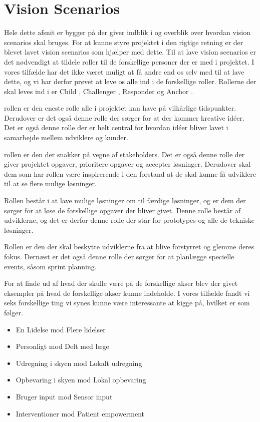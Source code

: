 \section{Vision Scenarios}
Hele dette afsnit er bygger på \citet[Sektion 17.1]{art:essence} der giver indblik i og overblik over hvordan vision scenarios skal bruges.
For at kunne styre projektet i den rigtige retning er der blevet lavet vision scenarios som hjælper med dette.
Til at lave vision scenarios er det nødvendigt at tildele roller til de forskellige personer der er med i projektet.
I vores tilfælde har det ikke været muligt at få andre end os selv med til at lave dette, og vi har derfor prøvet at leve os alle ind i de forskellige roller.
Rollerne der skal leves ind i er Child \citep[Sektion 18]{art:essence}, Challenger \citep[Sektion 19]{art:essence}, Responder \citep[Sektion 20]{art:essence} og Anchor \citep[Sektion 21]{art:essence}.

\begin{description}[style=nextline]
	\item[Child] 
		rollen er den eneste rolle alle i projektet kan have på vilkårlige tidspunkter.
		Derudover er det også denne rolle der sørger for at der kommer kreative idéer.
		Det er også denne rolle der er helt central for hvordan idéer bliver lavet i samarbejde mellem udviklere og kunder. 
	\item[Challenger]
		rollen er den der snakker på vegne af stakeholders.
		Det er også denne rolle der giver projektet opgaver, prioritere opgaver og accepter løsninger.
		Derudover skal dem som har rollen være inspirerende i den forstand at de skal kunne få udviklere til at se flere mulige løsninger. 
	\item[Responder]
		Rollen består i at lave mulige løsninger om til færdige løsninger, og er dem der sørger for at løse de forskellige opgaver der bliver givet.
		Denne rolle består af udviklerne, og det er derfor denne rolle der står for prototypes og alle de tekniske løsninger.
	\item[Anchor]
		Rollen er den der skal beskytte udviklerne fra at blive forstyrret og glemme deres fokus.
		Dernæst er det også denne rolle der sørger for at planlægge specielle events, såsom sprint planning.
\end{description}

For at finde ud af hvad der skulle være på de forskellige akser blev der givet eksempler på hvad de forskellige akser kunne indeholde.
I vores tilfælde fandt vi seks forskellige ting vi synes kunne være interessante at kigge på, hvilket er som følger.
\begin{itemize}
	\item En Lidelse mod Flere lidelser
	\item Personligt mod Delt med læge
	\item Udregning i skyen mod Lokalt udregning
	\item Opbevaring i skyen mod Lokal opbevaring
	\item Bruger input mod Sensor input
	\item Interventioner mod Patient empowerment
\end{itemize}


